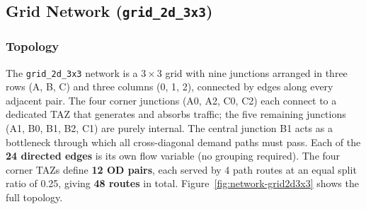 \documentclass[11pt]{article}
\begin{document}
\subsection{Grid Network (\texttt{grid\_2d\_3x3})}
\label{app:network_grid2d3x3}

\subsubsection*{Topology}

The \texttt{grid\_2d\_3x3} network is a $3\times 3$  grid with nine
junctions arranged in three rows (A, B, C) and three columns (0, 1, 2),
connected by edges along every adjacent pair. The four corner
junctions (A0, A2, C0, C2) each connect to a dedicated TAZ that generates
and absorbs traffic; the five remaining junctions (A1, B0, B1, B2, C1) are
purely internal. The central junction B1 acts as a bottleneck through which
all cross-diagonal demand paths must pass. Each of the \textbf{24 directed edges} is
its own flow variable (no grouping required). The four corner TAZs define
\textbf{12 OD pairs}, each served by 4 path routes at an equal split
ratio of 0.25, giving \textbf{48 routes} in total.
Figure~\ref{fig:network-grid2d3x3} shows the full topology.
\end{document}
